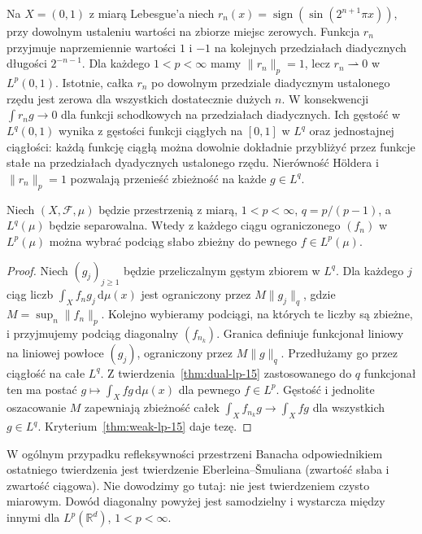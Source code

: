 \begin{przyklad}
Na $X=(0,1)$ z miarą Lebesgue'a niech
$r_n(x)=\operatorname{sign}(\sin(2^{n+1}\pi x))$,
przy dowolnym ustaleniu wartości na zbiorze miejsc zerowych.
Funkcja $r_n$ przyjmuje naprzemiennie wartości $1$ i $-1$
na kolejnych przedziałach diadycznych długości $2^{-n-1}$.
Dla każdego $1<p<\infty$ mamy $\|r_n\|_p=1$, lecz
$r_n\rightharpoonup0$ w $L^p(0,1)$. Istotnie, całka
$r_n$ po dowolnym przedziale diadycznym ustalonego
rzędu jest zerowa dla wszystkich dostatecznie dużych $n$.
W konsekwencji $\int r_ng\to0$ dla funkcji schodkowych
na przedziałach diadycznych. Ich gęstość w $L^q(0,1)$ wynika z gęstości funkcji
ciągłych na $[0,1]$ w $L^q$ oraz jednostajnej
ciągłości: każdą funkcję ciągłą można dowolnie
dokładnie przybliżyć przez funkcje stałe na
przedziałach dyadycznych ustalonego rzędu.
Nierówność Höldera i $\|r_n\|_p=1$ pozwalają
przenieść zbieżność na każde $g\in L^q$.
\end{przyklad}

\begin{twierdzenie}
\label{thm:weak-subseq-15}
Niech $(X,\mathcal F,\mu)$ będzie przestrzenią z miarą,
$1<p<\infty$, $q=p/(p-1)$, a $L^q(\mu)$ będzie separowalna.
Wtedy z każdego ciągu ograniczonego $(f_n)$ w $L^p(\mu)$
można wybrać podciąg słabo zbieżny do pewnego $f\in L^p(\mu)$.
\end{twierdzenie}
\begin{proof}
Niech $(g_j)_{j\ge1}$ będzie przeliczalnym gęstym
zbiorem w $L^q$. Dla każdego $j$ ciąg liczb
$\int_Xf_n g_j\,\mathrm d\mu(x)$ jest ograniczony przez
$M\|g_j\|_q$, gdzie $M=\sup_n\|f_n\|_p$.
Kolejno wybieramy podciągi, na których te liczby
są zbieżne, i przyjmujemy podciąg diagonalny
$(f_{n_k})$. Granica definiuje funkcjonał liniowy na
liniowej powłoce $(g_j)$, ograniczony przez $M\|g\|_q$.
Przedłużamy go przez ciągłość na całe $L^q$.
Z twierdzenia~\ref{thm:dual-lp-15} zastosowanego do $q$
funkcjonał ten ma postać $g\mapsto\int_Xfg\,\mathrm d\mu(x)$
dla pewnego $f\in L^p$. Gęstość i jednolite
oszacowanie $M$ zapewniają zbieżność całek
$\int_Xf_{n_k}g\to\int_Xfg$ dla wszystkich $g\in L^q$.
Kryterium~\ref{thm:weak-lp-15} daje tezę.
\end{proof}

\begin{uwaga}
W ogólnym przypadku refleksywności przestrzeni Banacha
odpowiednikiem ostatniego twierdzenia jest twierdzenie
Eberleina--\v Smuliana (zwartość słaba i zwartość ciągowa).
Nie dowodzimy go tutaj: nie jest twierdzeniem czysto
miarowym. Dowód diagonalny powyżej jest samodzielny
i wystarcza między innymi dla $L^p(\mathbb R^d)$,
$1<p<\infty$.
\end{uwaga}

